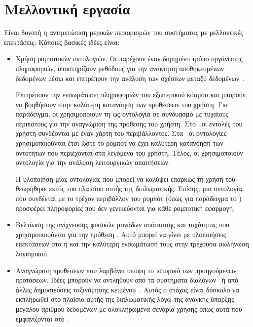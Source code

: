 \section{Μελλοντική εργασία}
Είναι δυνατή η αντιμετώπιση μερικών περιορισμών του συστήματος με μελλοντικές επεκτάσεις.
Κάποιες βασικές ιδέες είναι:
\begin{itemize}
    \item Χρήση ρομποτικών οντολογιών.
          Οι  παρέχουν έναν δομημένο τρόπο οργάνωσης πληροφοριών,
          υποστηρίζουν μεθόδους για την ανάκτηση αποθηκευμένων δεδομένων μέσω 
          και επιτρέπουν την ανάλυση των σχέσεων μεταξύ δεδομένων~\cite{diamantopoulos2017software}.

          Επιτρέπουν την ενσωμάτωση πληροφοριών του εξωτερικού κόσμου και μπορούν να βοηθήσουν στην καλύτερη κατανόηση των προθέσεων του χρήστη.
          Για παράδειγμα, οι \citet{hu2009understanding} χρησιμοποιούν τη  ως οντολογία σε συνδυασμό με τυχαίους περιπάτους για την αναγνώριση της πρόθεσης του χρήστη.
          Στο~\cite{zang2018translating} οι εντολές του χρήστη συνδέονται με έναν χάρτη του περιβάλλοντος.
          Στα~\cite{salamknowledge,zhang2018learning,nyga2018grounding} οι οντολογίες χρησιμοποιούνται έτσι ώστε το ρομπότ να έχει καλύτερη κατανόηση των οντοτήτων που περιέχονται στα λεγόμενα του χρήστη.
          Τέλος, οι \citet{diamantopoulos2017software} χρησιμοποιούν οντολογία για την ανάλυση λειτουργικών απαιτήσεων.

          Η υλοποίηση μιας οντολογίας που μπορεί να καλύψει επαρκώς τη χρήση του \metamodel{} θεωρήθηκε εκτός του πλαισίου αυτής της διπλωματικής.
          Επίσης, μια οντολογία που συνδέεται με το τρέχον περιβάλλον του ρομπότ (όπως για παράδειγμα το ) προσφέρει πληροφορίες που δεν γενικεύονται για κάθε ρομποτική εφαρμογή.
    \item Βελτίωση της ανίχνευσης φυσικών μονάδων απόστασης και ταχύτητας που χρησιμοποιούνται για την πρόθεση .
          Αυτό μπορεί να γίνει με υλοποιήσεις επεκτάσεων στα  ή  και την καλύτερη ενσωμάτωσή τους στην τρέχουσα σωλήνωση λογισμικού.
    \item Αναγνώριση προθέσεων που λαμβάνει υπόψη το ιστορικό των προηγούμενων προτάσεων.
          Ιδέες μπορούν να αντληθούν από τα συστήματα διαλόγων~\cite{bhargava2013easy} ή από άλλες δημοσιεύσεις ταξινόμησης κειμένου~\cite{lee2016sequential}.
          Αυτός ο στόχος είναι δύσκολο να εκπληρωθεί στο πλαίσιο αυτής της διπλωματικής λόγω της ανάγκης ύπαρξης μεγάλου αριθμού δεδομένων με ολοκληρωμένα σενάρια χρήσης όπως αυτά που εμφανίζονται στο .


\end{itemize}
